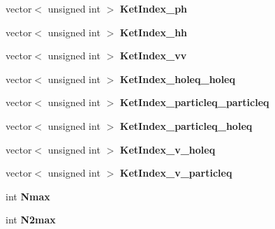 \begin{DoxyCompactItemize}
\item 
\hypertarget{classModelSpace_af44868c3305c5075d5d28eea852181e6}{vector$<$ unsigned int $>$ {\bfseries Ket\-Index\-\_\-ph}}\label{classModelSpace_af44868c3305c5075d5d28eea852181e6}

\item 
\hypertarget{classModelSpace_a3f04718b733b5caf560c492c801a8731}{vector$<$ unsigned int $>$ {\bfseries Ket\-Index\-\_\-hh}}\label{classModelSpace_a3f04718b733b5caf560c492c801a8731}

\item 
\hypertarget{classModelSpace_a3ecc0c7063f0056f341c107cb229e88b}{vector$<$ unsigned int $>$ {\bfseries Ket\-Index\-\_\-vv}}\label{classModelSpace_a3ecc0c7063f0056f341c107cb229e88b}

\item 
\hypertarget{classModelSpace_af8033c31d5c1351d6f1ecdda694058ee}{vector$<$ unsigned int $>$ {\bfseries Ket\-Index\-\_\-holeq\-\_\-holeq}}\label{classModelSpace_af8033c31d5c1351d6f1ecdda694058ee}

\item 
\hypertarget{classModelSpace_aea7ddde88f5d0df15669b556d381e0c6}{vector$<$ unsigned int $>$ {\bfseries Ket\-Index\-\_\-particleq\-\_\-particleq}}\label{classModelSpace_aea7ddde88f5d0df15669b556d381e0c6}

\item 
\hypertarget{classModelSpace_a04dd41a6527fc515ab686f997de1a788}{vector$<$ unsigned int $>$ {\bfseries Ket\-Index\-\_\-particleq\-\_\-holeq}}\label{classModelSpace_a04dd41a6527fc515ab686f997de1a788}

\item 
\hypertarget{classModelSpace_a00a9487a4455b6dcdffc541db2519257}{vector$<$ unsigned int $>$ {\bfseries Ket\-Index\-\_\-v\-\_\-holeq}}\label{classModelSpace_a00a9487a4455b6dcdffc541db2519257}

\item 
\hypertarget{classModelSpace_abcc36f360b16aaac3f4e2d43f8267c67}{vector$<$ unsigned int $>$ {\bfseries Ket\-Index\-\_\-v\-\_\-particleq}}\label{classModelSpace_abcc36f360b16aaac3f4e2d43f8267c67}

\item 
\hypertarget{classModelSpace_aa049d819d4d18cfb466777581cc349d2}{int {\bfseries Nmax}}\label{classModelSpace_aa049d819d4d18cfb466777581cc349d2}

\item 
\hypertarget{classModelSpace_a60db71713d3964af214756163ba0585e}{int {\bfseries N2max}}\label{classModelSpace_a60db71713d3964af214756163ba0585e}


\end{DoxyCompactItemize}
